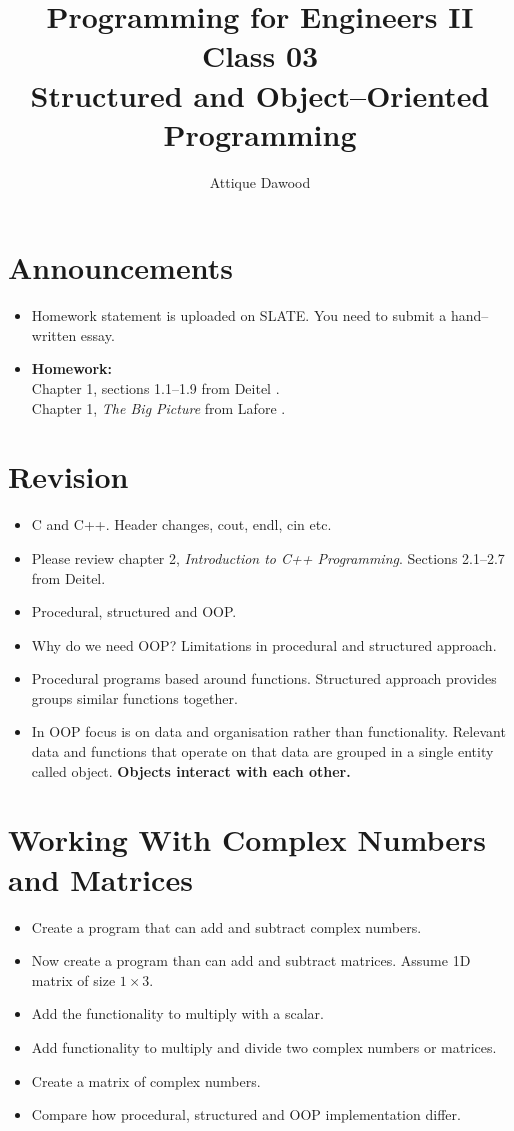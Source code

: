 \documentclass[12pt,a4paper]{article}
\title{\vspace{-2cm}Programming for Engineers II\\Class 03\\Structured and Object--Oriented Programming}
\author{Attique Dawood}
\begin{document}
\maketitle
\section{Announcements}
\begin{itemize}
\item Homework statement is uploaded on SLATE. You need to submit a hand--written essay.
\item \textbf{Homework:}\\
Chapter 1, sections 1.1--1.9 from Deitel \cite{Deitel}.\\
Chapter 1, \textit{The Big Picture} from Lafore \cite{Lafore}.\\
\end{itemize}
\section{Revision}
\begin{itemize}
\item C and C++. Header changes, cout, endl, cin etc.
\item Please review chapter 2, \textit{Introduction to C++ Programming}. Sections 2.1--2.7 from Deitel.
\item Procedural, structured and OOP.
\item Why do we need OOP? Limitations in procedural and structured approach.
\item Procedural programs based around functions. Structured approach provides groups similar functions together.
\item In OOP focus is on data and organisation rather than functionality. Relevant data and functions that operate on that data are grouped in a single entity called object. \textbf{Objects interact with each other.}
\end{itemize}
\section{Working With Complex Numbers and Matrices}
\begin{itemize}
\item Create a program that can add and subtract complex numbers.
\item Now create a program than can add and subtract matrices. Assume 1D matrix of size $1\times 3$.
\item Add the functionality to multiply with a scalar.
\item Add functionality to multiply and divide two complex numbers or matrices.
\item Create a matrix of complex numbers.
\item Compare how procedural, structured and OOP implementation differ.
\end{itemize}
\end{document}
